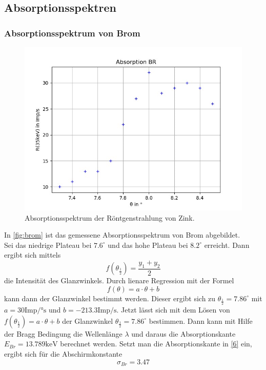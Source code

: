 \subsection{Absorptionsspektren}
\label{subsec:absorptionsspektrum}


\subsubsection*{Absorptionsspektrum von Brom}
\label{brom}

\begin{figure}[H]
  \centering
  \includegraphics{content/Br.png}
  \caption{Absorptionsspektrum der Röntgenstrahlung von Zink.}
  \label{fig:br}
\end{figure}
In \autoref{fig:brom} ist das gemessene Absorptionsspektrum von Brom abgebildet.\\
Sei das niedrige Plateau bei $7.6^\circ$ und das hohe Plateau bei $8.2^\circ$ erreicht. Dann ergibt sich mittels 
\begin{equation*}
  f(\theta_{\frac{1}{2}})=\frac{y_1 +y_2}{2}
\end{equation*}
die Intensität des Glanzwinkels. Durch lienare Regression mit der Formel
\begin{equation}
  f(\theta)=a\cdot\theta + b
  \label{reg}
\end{equation}
kann dann der Glanzwinkel bestimmt werden. Dieser ergibt sich zu $\theta_{\frac{1}{2}}=7.86^\circ$ mit $a=30 \textrm{Imp/°s}$ und $b=-213.3 \textrm{Imp/s}$.
Jetzt lässt sich mit dem Lösen von $f(\theta_{\frac{1}{2}})=a\cdot\theta + b$ der Glanzwinkel $\theta_{\frac{1}{2}}=7.86^\circ$ bestimmen. Dann kann mit Hilfe der Bragg Bedingung die Wellenlänge $\lambda$ und daraus die Absorptionskante $E_{Br}=13.789 \textrm{keV}$ berechnet werden.
Setzt man die Absorptionskante in \eqref{6} ein, ergibt sich für die Abschirmkonstante 
\begin{equation*}
  \sigma_{Br}=3.47
\end{equation*}



